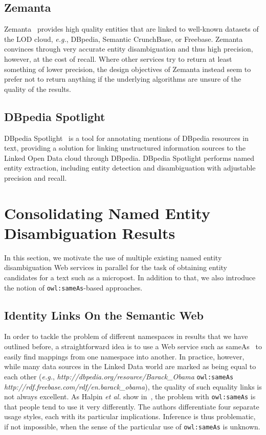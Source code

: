 \subsection{Zemanta}
Zemanta~\cite{Zemanta} provides high quality entities that are linked to well-known datasets of the LOD cloud, \emph{e.g.}, DBpedia, Semantic CrunchBase, or Freebase. Zemanta convinces through very accurate entity disambiguation and thus high precision, however, at the cost of recall. Where other services try to return at least something of lower precision, the design objectives of Zemanta instead seem to prefer not to return anything if the underlying algorithms are unsure of the quality of the results. 

\subsection{DBpedia Spotlight}
DBpedia Spotlight~\cite{spotlight} is a tool for annotating mentions of DBpedia resources in text, providing a solution for linking unstructured information sources to the Linked Open Data cloud through DBpedia. DBpedia Spotlight performs named entity extraction, including entity detection and disambiguation with adjustable precision and recall.

\section{Consolidating Named Entity Disambiguation Results} \label{sec:consolidate}
In this section, we motivate the use of multiple existing named entity disambiguation Web services in parallel for the task of
obtaining entity candidates for a text such as a micropost. In addition to that, we also introduce the notion of
\texttt{owl:sameAs}-based approaches.

\subsection{Identity Links On the Semantic Web}                             \label{sec:sameasorg}
In order to tackle the problem of different namespaces in results that we have outlined before, a straightforward idea is to use a Web service such as
sameAs~\cite{Glaser:SameAs} to easily find mappings from one namespace into another. In practice,
however, while many data sources in the Linked Data world are marked as being equal to each other (\emph{e.g.},
\textit{http://dbpedia.org/resource/Barack\_Obama} \texttt{owl:sameAs} \textit{http://rdf.freebase.com/rdf/en.barack\_obama}),
the quality of such equality links is not always excellent. As Halpin \emph{et al.} show in~\cite{Halpin:SameAs}, the problem
with \texttt{owl:sameAs} is that people tend to use it very differently. The authors 
differentiate four separate usage styles, each with its particular implications. Inference is thus problematic, if not
impossible, when the sense of the particular use of \texttt{owl:sameAs} is unknown.

